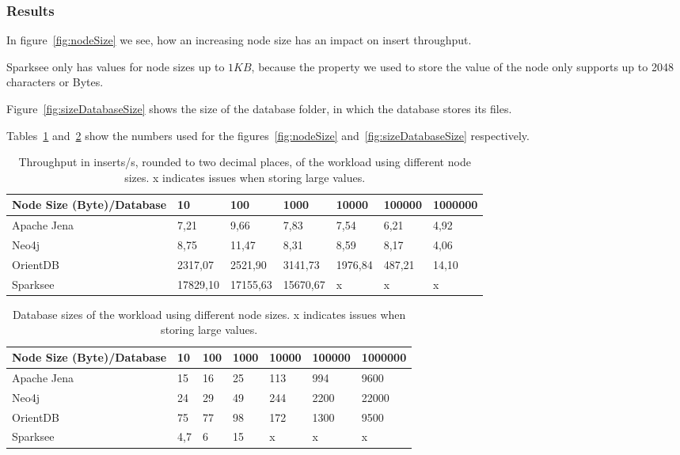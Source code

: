 \subsubsection{Results}
In figure~\ref{fig:nodeSize} we see,
how an increasing node size has an impact on insert throughput.

Sparksee only has values for node sizes up to $ 1KB $,
because the property we used to store the value of the node only supports up to 2048 characters or Bytes.

Figure~\ref{fig:sizeDatabaseSize} shows the size of the database folder,
in which the database stores its files.

Tables~\ref{tab:nodeSize} and~\ref{tab:sizeDatabaseSize} show the numbers used for the figures~\ref{fig:nodeSize} and~\ref{fig:sizeDatabaseSize} respectively.

\begin{table}[h!]
  \begin{minipage}{\textwidth}
    \centering
    \begin{tabularx}{\textwidth}{ | X | l | l | l | l | l | l | }
      \hline
      Node Size (Byte)/Database & 10 & 100 & 1000 & 10000 & 100000 & 1000000 \\ \hline
      Apache Jena & 7,21 & 9,66 & 7,83 & 7,54 & 6,21 & 4,92 \\ \hline
      Neo4j & 8,75 & 11,47 & 8,31 & 8,59 & 8,17 & 4,06 \\ \hline
      OrientDB & 2317,07 & 2521,90 & 3141,73 & 1976,84 & 487,21 & 14,10 \\ \hline
      Sparksee & 17829,10 & 17155,63 & 15670,67 & x & x & x \\ \hline
    \end{tabularx}
  \end{minipage}
  \caption{Throughput in inserts/s, rounded to two decimal places, of the workload using different node sizes. x indicates issues when storing large values.}
  \label{tab:nodeSize}
\end{table}

\begin{table}[h!]
  \begin{minipage}{\textwidth}
    \centering
    \begin{tabular}{ | l | l | l | l | l | l | l | }
      \hline
      Node Size (Byte)/Database & 10 & 100 & 1000 & 10000 & 100000 & 1000000 \\ \hline
      Apache Jena & 15 & 16 & 25 & 113 & 994 & 9600 \\ \hline
      Neo4j & 24 & 29 & 49 & 244 & 2200 & 22000 \\ \hline
      OrientDB & 75 & 77 & 98 & 172 & 1300 & 9500 \\ \hline
      Sparksee & 4,7 & 6 & 15 & x & x & x \\ \hline
    \end{tabular}
  \end{minipage}
  \caption{Database sizes of the workload using different node sizes. x indicates issues when storing large values.}
  \label{tab:sizeDatabaseSize}
\end{table}

